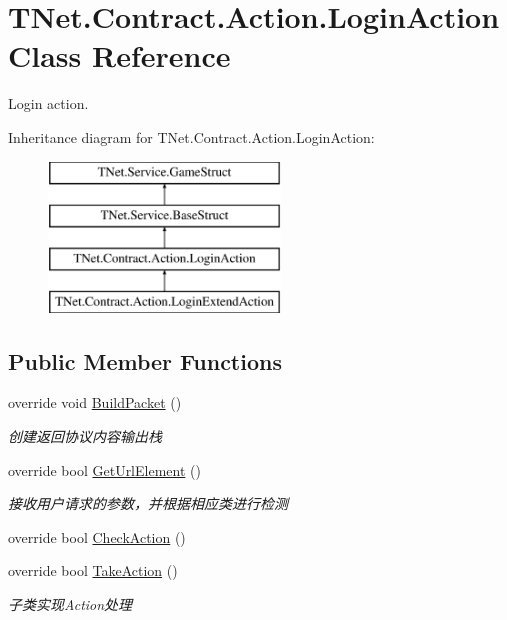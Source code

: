 \hypertarget{class_t_net_1_1_contract_1_1_action_1_1_login_action}{}\section{T\+Net.\+Contract.\+Action.\+Login\+Action Class Reference}
\label{class_t_net_1_1_contract_1_1_action_1_1_login_action}


Login action.  


Inheritance diagram for T\+Net.\+Contract.\+Action.\+Login\+Action\+:\begin{figure}[H]
\begin{center}
\leavevmode
\includegraphics[height=4.000000cm]{class_t_net_1_1_contract_1_1_action_1_1_login_action}
\end{center}
\end{figure}
\subsection*{Public Member Functions}
\begin{DoxyCompactItemize}
\item 
override void \mbox{\hyperlink{class_t_net_1_1_contract_1_1_action_1_1_login_action_abad56bdb3d581655eb0f5b7ea13f529e}{Build\+Packet}} ()
\begin{DoxyCompactList}\small\item\em 创建返回协议内容输出栈 \end{DoxyCompactList}\item 
override bool \mbox{\hyperlink{class_t_net_1_1_contract_1_1_action_1_1_login_action_af7e51da954d6f20e1663c128fefe82b4}{Get\+Url\+Element}} ()
\begin{DoxyCompactList}\small\item\em 接收用户请求的参数，并根据相应类进行检测 \end{DoxyCompactList}\item 
override bool \mbox{\hyperlink{class_t_net_1_1_contract_1_1_action_1_1_login_action_ad91710333b360bfc9148f08228161467}{Check\+Action}} ()
\item 
override bool \mbox{\hyperlink{class_t_net_1_1_contract_1_1_action_1_1_login_action_a6ebe6efbb40f61f586ac86f9a3428edf}{Take\+Action}} ()
\begin{DoxyCompactList}\small\item\em 子类实现\+Action处理 \end{DoxyCompactList}\end{DoxyCompactItemize}
